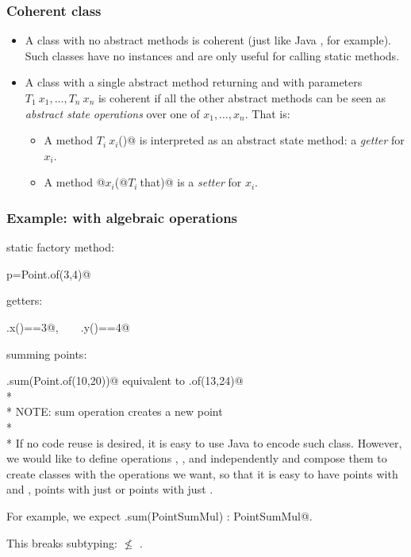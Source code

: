 \begin{frame}[fragile]
\frametitle{Coherent class}
\begin{itemize}
\item A class with no abstract methods is coherent (just like Java
  \Q@Math@, for example). Such classes have no instances and are only useful for calling static methods.
\item A class with a single abstract \Q@static@ method 
returning \Q@This@ and with parameters $T_1\ x_1, \ldots, T_n\ x_n$
is coherent if all the other abstract methods can be seen as \emph{abstract state
operations} over one of $x_1, \ldots, x_n$.
That is:
\begin{itemize}
\item A method $T_i\ x_i$\Q@()@ is interpreted as an abstract state method: a \emph{getter} for $x_i$.
\item A method \Q@void @$x_i$\Q@(@$T_i\ $\Q@ that)@ is a \emph{setter} for $x_i$.
\end{itemize}
\end{itemize}
\end{frame}


\begin{frame}[fragile]
\frametitle{Example: \Q@Point@s with algebraic operations}

static factory method:

\quad\quad \Q@Point p=Point.of(3,4)@

getters:

\quad\quad \Q@p.x()==3@,\ \ \ \   \Q@p.y()==4@

summing points:

\quad\quad \Q@p.sum(Point.of(10,20))@ equivalent to \Q@Point.of(13,24)@
\\*${}_{}$\\*
NOTE: sum operation creates a new point
\\*${}_{}$\\*
If no code reuse is desired, it is easy to use Java to encode such \Q@Point@ class.
However, we would like to define operations \Q@sum@, \Q@mul@, \Q@div@ and \Q@sub@
independently and compose them to create classes with the operations we want,
so that it is easy to have points with \Q@sum@ and \Q@mul@, points with
just \Q@sum@ or points with just \Q@mul@.

For example, we expect \Q@PointSumMul.sum(PointSumMul) : PointSumMul@.

This breaks subtyping: \Q@PointSumMul@ $\not\leq$ \Q@PointSum@.


\end{frame}


